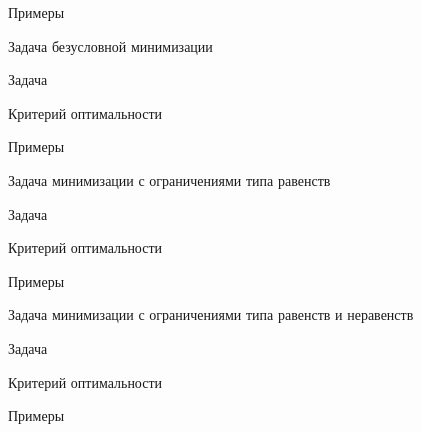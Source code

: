 \documentclass[12pt,russian]{beamer}
\begin{document}
\begin{frame}{Примеры}

\end{frame}

\begin{frame}{Задача безусловной минимизации}

\begin{block}{Задача}

\end{block}

\begin{block}{Критерий оптимальности}

\end{block}

\end{frame}

\begin{frame}{Примеры}

\end{frame}

\begin{frame}{{\small Задача минимизации с ограничениями типа равенств}}

\begin{block}{Задача}

\end{block}

\begin{block}{Критерий оптимальности}

\end{block}

\end{frame}

\begin{frame}{Примеры}

\end{frame}

\begin{frame}{{\small Задача минимизации с ограничениями типа равенств и неравенств}}

\begin{block}{Задача}

\end{block}

\begin{block}{Критерий оптимальности}

\end{block}

\end{frame}

\begin{frame}{Примеры}

\end{frame}
\end{document}
